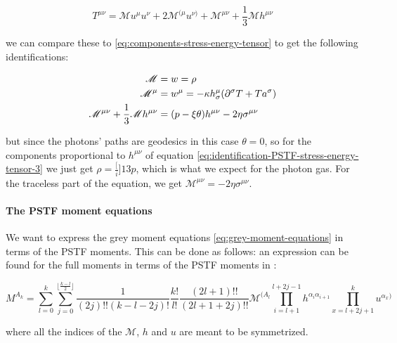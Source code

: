 \documentclass[main.tex]{subfiles}
\begin{document}
\begin{equation} \label{eq:PSTF-stress-energy-tensor-decomposition}
    T^{\mu\nu} = \mathscr M u^\mu u^\nu + 2 \mathscr M ^{(\mu} u^{\nu)}
    + \mathscr M ^{\mu\nu} + \frac{1}{3} \mathscr M h^{\mu\nu}
\end{equation}

we can compare these to \eqref{eq:components-stress-energy-tensor} to get the following identifications:

\begin{subequations}
\begin{align}
  \mathscr M &= w = \rho  \label{eq:identification-PSTF-stress-energy-tensor-1}\\
  \mathscr M ^\mu &= w^\mu = -\kappa h^\mu _\sigma  \qty(\partial^\sigma T + T a^\sigma) \label{eq:identification-PSTF-stress-energy-tensor-2}\\
  \mathscr M^{\mu\nu} + \frac{1}{3} \mathscr M h^{\mu\nu}
  &= (p - \xi \theta)h^{\mu\nu} - 2 \eta \sigma^{\mu\nu} \label{eq:identification-PSTF-stress-energy-tensor-3}
\end{align}
\end{subequations}

but since the photons' paths are geodesics in this case \(\theta = 0\), so for the components proportional to \(h^{\mu\nu}\) of equation \eqref{eq:identification-PSTF-stress-energy-tensor-3} we just get \(\rho = \frac[i]{1}{3} p\), which is what we expect for the photon gas.
For the traceless part of the equation, we get \(\mathscr M ^{\mu\nu} = -2 \eta \sigma^{\mu\nu}\).

\paragraph{The PSTF moment equations}

We want to express the grey moment equations \eqref{eq:grey-moment-equations} in terms of the PSTF moments. This can be done as follows: an expression can be found for the full moments in terms of the PSTF moments in \cite[eq. 4.10c]{Thorne:1981feb}:

\begin{equation}
  M^{A_k} = \sum_{l=0}^k \sum_{j=0}^{\lfloor \frac{k-l}{2} \rfloor}
  \frac{1}{(2j)!! (k-l-2j)!}  \frac{k!}{l!} \frac{(2l+1)!!}{(2l+1+2j)!!}
  \mathscr M^{(A_l} \prod_{i=l+1}^{l+2j-1} h^{\alpha_i \alpha_{i+1}}
  \prod_{x=l+2j+1}^k u^{\alpha_x)}
\end{equation}

where all the indices of the \(\mathscr M\), \(h\) and \(u\) are meant to be symmetrized.
\end{document}

